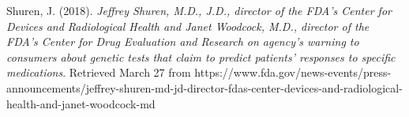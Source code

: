 \documentclass[
]{article}
\begin{document}
Shuren, J. (2018). \emph{Jeffrey Shuren, M.D., J.D., director of the
FDA's Center for Devices and Radiological Health and Janet Woodcock,
M.D., director of the FDA's Center for Drug Evaluation and Research on
agency's warning to consumers about genetic tests that claim to predict
patients' responses to specific medications}. Retrieved March 27 from
https://www.fda.gov/news-events/press-announcements/jeffrey-shuren-md-jd-director-fdas-center-devices-and-radiological-health-and-janet-woodcock-md

\hfill\break
\end{document}
